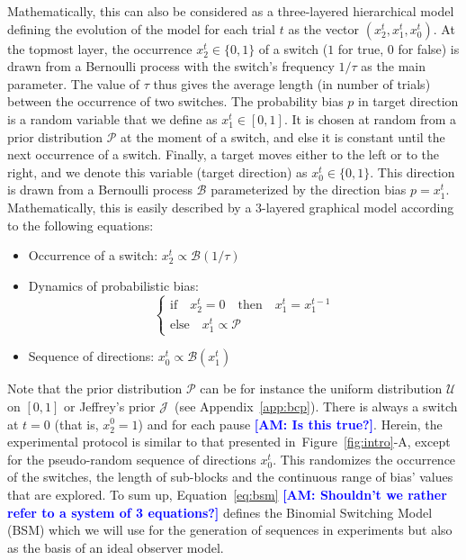 \documentclass[12pt,english]{article}%
\newcommand{\choice}[1]{ %
	\left\{ %
		\begin{array}{l} #1 \end{array} %
	\right. }
\newcommand{\eql}[1]{\begin{equation}#1\end{equation}}
\newcommand{\Bb}{\mathcal{B}}
\newcommand{\Jj}{\mathcal{J}}
\newcommand{\Pp}{\mathcal{P}}
\newcommand{\Uu}{\mathcal{U}}
\newcommand{\seeFig}[1]{Figure~\ref{fig:#1}}
\newcommand{\seeEq}[1]{Equation~\ref{eq:#1}}
\newcommand{\seeApp}[1]{Appendix~\ref{app:#1}}
\newcommand{\AM}[1]{\textbf{\textcolor{blue}{[AM: #1]}}}
\begin{document}
Mathematically, this can also be considered as a three-layered hierarchical model
defining the evolution of the model for each trial $t$ as the vector  $(x_2^t, x_1^t, x_0^t)$.
At the topmost layer,
the occurrence $x_2^t \in \{ 0, 1 \}$ of a switch ($1$ for true, $0$ for false)
is  drawn from a Bernoulli process with the switch's frequency $1/\tau$ as the main parameter.
The value of $\tau$ thus gives the average length (in number of trials)
between the occurrence of two switches.
The probability bias $p$ in target direction is a random variable that we define as $x_1^t \in [0, 1]$.
It is chosen at random from a prior distribution $\Pp$ at the moment of a switch,
and else it is constant until the next occurrence of a switch.
Finally, a target moves either to the left or to the right,
and we denote this variable (target direction) as $x_0^t \in \{ 0, 1 \}$.
This direction is drawn from a Bernoulli process $\Bb$
parameterized by the direction bias $p=x_1^t$.
Mathematically, this is easily described
by a 3-layered graphical model according to %
the following equations:
\begin{itemize}
    \item Occurrence of a switch: $x_2^t \propto \Bb(1/\tau)$
    \item Dynamics of probabilistic bias: \eql{\choice{\text{if} \quad x_2^t=0 \quad \text{then} \quad  x_1^t = x_1^{t-1} \\
\text{else} \quad x_1^t \propto \Pp  }\label{eq:bsm}}
    \item Sequence of directions:  $x_0^t \propto \Bb(x_1^t)$
\end{itemize}
Note that the prior distribution $\Pp$ can be for instance
the uniform distribution $\Uu$ on $ [ 0, 1 ] $ or
Jeffrey's prior $\Jj$~(see \seeApp{bcp}).
There is always a switch at $t=0$ (that is, $x_2^0=1$) and for each pause \AM{Is this true?}.
Herein, the experimental protocol is similar
to that presented in~\seeFig{intro}-A,
except for the pseudo-random sequence of directions $x_0^t$.
This randomizes the occurrence of the switches,
the length of sub-blocks
and the continuous range of bias' values that are explored.
To sum up, \seeEq{bsm} \AM{Shouldn't we rather refer to a system of 3 equations?} defines the Binomial Switching Model (BSM)
which we will use for the generation of sequences in experiments
but also as the basis of an ideal observer model.
\end{document}
